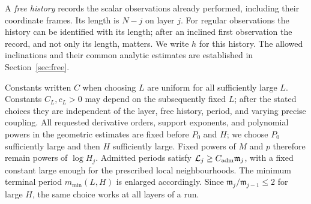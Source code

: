 A \emph{free history} records the scalar observations already performed,
including their coordinate frames.  Its length is \(N-j\) on layer
\(j\).  For regular observations the history can be identified with its
length; after an inclined first observation the record, and not only
its length, matters.  We write \(h\) for this history.  The allowed
inclinations and their common analytic estimates are established in
Section~\ref{sec:free}.

Constants written \(C\) when choosing \(L\) are uniform for all
sufficiently large \(L\).  Constants \(C_L,c_L>0\) may depend on the
subsequently fixed \(L\); after the stated choices they are independent
of the layer, free history, period, and varying precise coupling.  All requested derivative orders, support
exponents, and polynomial powers in the geometric estimates are fixed
before \(P_0\) and \(H\); we choose \(P_0\) sufficiently large and then
\(H\) sufficiently large.  Fixed powers of \(M\) and \(p\) therefore
remain powers of \(\log H_j\).  Admitted periods satisfy \(\mathcal L_j\ge C_{\rm adm}\mathfrak m_j\),
with a fixed constant large enough for the prescribed local neighbourhoods.
The minimum terminal period \(m_{\min}(L,H)\) is enlarged accordingly.  Since \(\mathfrak m_j/\mathfrak m_{j-1}\le2\) for
large \(H\), the same choice works at all layers of a run.

